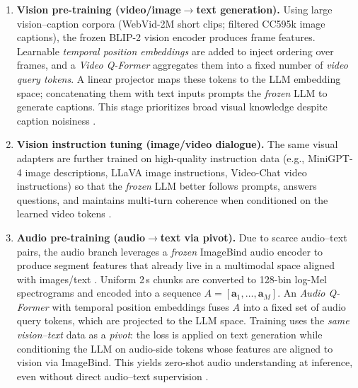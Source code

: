 \begin{enrichment}
\begin{enrichment}
        \begin{enumerate}[label=(\alph*), leftmargin=1.4em, itemsep=0.25em]
            \item \textbf{Vision pre\mbox{-}training (video/image$\to$text generation).} Using large vision–caption corpora (WebVid\mbox{-}2M short clips; filtered CC595k image captions), the frozen BLIP\mbox{-}2 vision encoder produces frame features. Learnable \emph{temporal position embeddings} are added to inject ordering over frames, and a \emph{Video Q\mbox{-}Former} aggregates them into a fixed number of \emph{video query tokens}. A linear projector maps these tokens to the LLM embedding space; concatenating them with text inputs prompts the \emph{frozen} LLM to generate captions. This stage prioritizes broad visual knowledge despite caption noisiness \cite[Sec.~2.1--2.2]{zhang2023_videollama}.
            \item \textbf{Vision instruction tuning (image/video dialogue).} The same visual adapters are further trained on high\mbox{-}quality instruction data (e.g., MiniGPT\mbox{-}4 image descriptions, LLaVA image instructions, Video\mbox{-}Chat video instructions) so that the \emph{frozen} LLM better follows prompts, answers questions, and maintains multi\mbox{-}turn coherence when conditioned on the learned video tokens \cite[Sec.~2.2]{zhang2023_videollama}.
            \item \textbf{Audio pre\mbox{-}training (audio$\to$text via pivot).} Due to scarce audio–text pairs, the audio branch leverages a \emph{frozen} ImageBind audio encoder to produce segment features that already live in a multimodal space aligned with images/text \cite{girdhar2023_imagebind}. Uniform 2\,s chunks are converted to 128\mbox{-}bin log\mbox{-}Mel spectrograms and encoded into a sequence $A=[\mathbf{a}_1,\ldots,\mathbf{a}_M]$. An \emph{Audio Q\mbox{-}Former} with temporal position embeddings fuses $A$ into a fixed set of audio query tokens, which are projected to the LLM space. Training uses the \emph{same vision–text} data as a \emph{pivot}: the loss is applied on text generation while conditioning the LLM on audio\mbox{-}side tokens whose features are aligned to vision via ImageBind. This yields zero\mbox{-}shot audio understanding at inference, even without direct audio–text supervision \cite[Sec.~2.1.2,~2.2.2]{zhang2023_videollama,girdhar2023_imagebind}.
        \end{enumerate}
        

\end{enrichment}
\end{enrichment}
